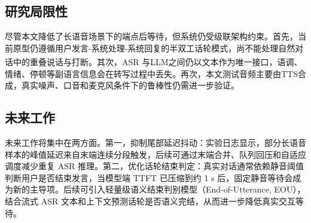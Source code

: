 \documentclass[UTF8,a4paper,zihao=5]{ctexart}
\newcommand{\upcite}[1]{\textsuperscript{\cite{#1}}}
\begin{document}
\subsection{研究局限性}

尽管本文降低了长语音场景下的端点后等待，但系统仍受级联架构约束。首先，当前原型仍遵循用户发言-系统处理-系统回复的半双工话轮模式，尚不能处理自然对话中的重叠说话与打断\upcite{ref22}。其次，ASR 与LLM之间仍以文本作为唯一接口，语调、情绪、停顿等副语言信息会在转写过程中丢失。再次，本文测试音频主要由TTS合成，真实噪声、口音和麦克风条件下的鲁棒性仍需进一步验证。

\subsection{未来工作}

未来工作将集中在两方面。第一，抑制尾部延迟抖动：实验日志显示，部分长语音样本的峰值延迟来自末端连续分段触发，后续可通过末端合并、队列回压和自适应调度减少重复 ASR 推理。第二，优化话轮结束判定：真实对话通常依赖静音阈值判断用户是否结束发言，当模型端 TTFT 已压缩到约 1 s 后，固定静音等待会成为新的主导项。后续可引入轻量级语义结束判别模型（End-of-Utterance, EOU），结合流式 ASR 文本和上下文预测话轮是否语义完结，从而进一步降低真实交互等待。
\end{document}
